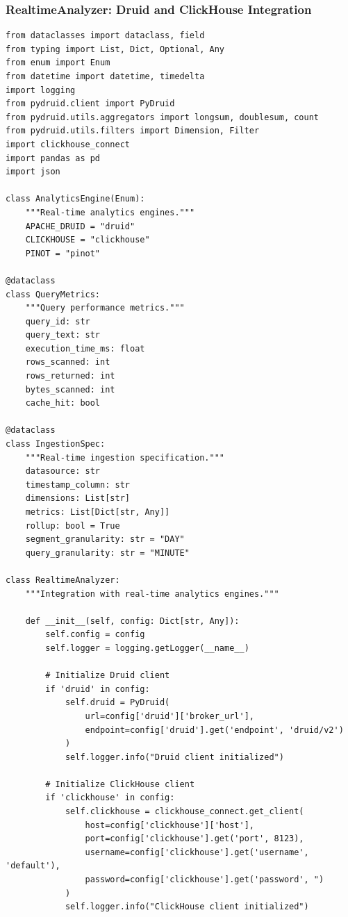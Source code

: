 \subsubsection{RealtimeAnalyzer: Druid and ClickHouse Integration}

\begin{lstlisting}[style=python, caption=RealtimeAnalyzer with Sub-Second Query Performance]
from dataclasses import dataclass, field
from typing import List, Dict, Optional, Any
from enum import Enum
from datetime import datetime, timedelta
import logging
from pydruid.client import PyDruid
from pydruid.utils.aggregators import longsum, doublesum, count
from pydruid.utils.filters import Dimension, Filter
import clickhouse_connect
import pandas as pd
import json

class AnalyticsEngine(Enum):
    """Real-time analytics engines."""
    APACHE_DRUID = "druid"
    CLICKHOUSE = "clickhouse"
    PINOT = "pinot"

@dataclass
class QueryMetrics:
    """Query performance metrics."""
    query_id: str
    query_text: str
    execution_time_ms: float
    rows_scanned: int
    rows_returned: int
    bytes_scanned: int
    cache_hit: bool

@dataclass
class IngestionSpec:
    """Real-time ingestion specification."""
    datasource: str
    timestamp_column: str
    dimensions: List[str]
    metrics: List[Dict[str, Any]]
    rollup: bool = True
    segment_granularity: str = "DAY"
    query_granularity: str = "MINUTE"

class RealtimeAnalyzer:
    """Integration with real-time analytics engines."""

    def __init__(self, config: Dict[str, Any]):
        self.config = config
        self.logger = logging.getLogger(__name__)

        # Initialize Druid client
        if 'druid' in config:
            self.druid = PyDruid(
                url=config['druid']['broker_url'],
                endpoint=config['druid'].get('endpoint', 'druid/v2')
            )
            self.logger.info("Druid client initialized")

        # Initialize ClickHouse client
        if 'clickhouse' in config:
            self.clickhouse = clickhouse_connect.get_client(
                host=config['clickhouse']['host'],
                port=config['clickhouse'].get('port', 8123),
                username=config['clickhouse'].get('username', 'default'),
                password=config['clickhouse'].get('password', ")
            )
            self.logger.info("ClickHouse client initialized")


\end{lstlisting}
